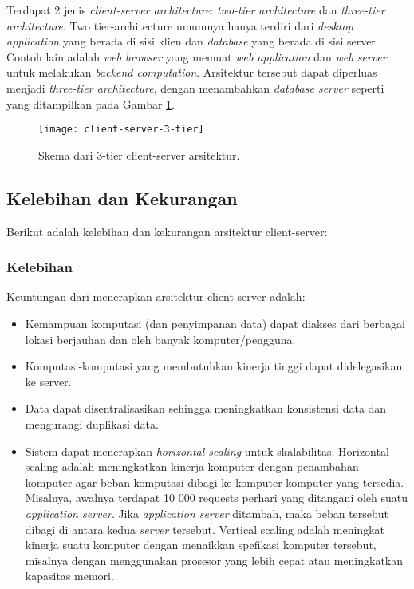 Terdapat 2 jenis \textit{client-server architecture}: \textit{two-tier architecture} dan \textit{three-tier architecture}. Two tier-architecture umumnya hanya terdiri dari \textit{desktop application} yang berada di sisi klien dan \textit{database} yang berada di sisi server. Contoh lain adalah \textit{web browser} yang memuat \textit{web application} dan \textit{web server} untuk melakukan \textit{backend computation}.
Arsitektur tersebut dapat diperluas menjadi \textit{three-tier architecture}, dengan menambahkan \textit{database server} seperti yang ditampilkan pada Gambar \ref{fig:client-server-schema}.

\begin{figure}[h]
\centering
\texttt{[image: client-server-3-tier]}
\caption{Skema dari 3-tier client-server arsitektur.}
\label{fig:client-server-schema}
\end{figure}

\subsection{Kelebihan dan Kekurangan}
Berikut adalah kelebihan dan kekurangan arsitektur client-server:

\subsubsection{Kelebihan}
Keuntungan dari menerapkan arsitektur client-server adalah:
\begin{itemize}
\item Kemampuan komputasi (dan penyimpanan data) dapat diakses dari berbagai lokasi berjauhan dan oleh banyak komputer/pengguna.
\item Komputasi-komputasi yang membutuhkan kinerja tinggi dapat didelegasikan ke server.
\item Data dapat disentralisasikan sehingga meningkatkan konsistensi data dan mengurangi duplikasi data.
\item  Sistem dapat menerapkan \textit{horizontal scaling }untuk skalabilitas. Horizontal scaling adalah meningkatkan kinerja komputer dengan penambahan komputer agar beban komputasi dibagi ke komputer-komputer yang tersedia. Misalnya, awalnya terdapat 10 000 requests perhari yang ditangani oleh suatu \textit{application server}. Jika \textit{application server} ditambah, maka beban tersebut dibagi di antara kedua \textit{server} tersebut. Vertical scaling adalah meningkat kinerja suatu komputer dengan menaikkan spefikasi komputer tersebut, misalnya dengan menggunakan prosesor yang lebih cepat atau meningkatkan kapasitas memori.
\end{itemize}

